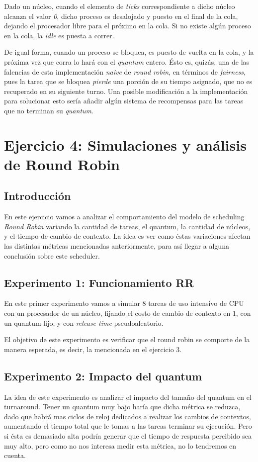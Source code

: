 \documentclass[a4paper]{article}
\begin{document}
Dado un núcleo, cuando el elemento de \textit{ticks} correspondiente a dicho
núcleo alcanza el valor \textit{0}, dicho proceso es desalojado y puesto en
el final de la cola, dejando el procesador libre para el próximo en la cola.
Si no existe algún proceso en la cola, la \textit{idle} es puesta a correr.

De igual forma, cuando un proceso se bloquea, es puesto de vuelta en la
cola, y la próxima vez que corra lo hará con el \textit{quantum} entero.
Ésto es, quizás, una de las falencias de esta implementación \textit{naive}
de \textit{round robin}, en términos de \textit{fairness}, pues la tarea que
se bloquea \textit{pierde} una porción de su tiempo asignado, que no es
recuperado en su siguiente turno. Una posible modificación a la
implementación para solucionar esto sería añadir algún sistema de
recompensas para las tareas que no terminan su \textit{quantum}.

\section{Ejercicio 4: Simulaciones y análisis de Round Robin}

\subsection{Introducción}
En este ejercicio vamos a analizar el comportamiento del modelo de
scheduling \textit{Round Robin} variando la cantidad de tareas, el quantum,
la cantidad de núcleos, y el tiempo de cambio de contexto.
La idea es ver como éstas variaciones afectan las distintas métricas
mencionadas anteriormente, para así llegar a alguna conclusión sobre este
scheduler.

\subsection{Experimento 1: Funcionamiento RR}
En este primer experimento vamos a simular 8 tareas de uso intensivo de CPU
con un procesador de un núcleo, fijando el costo de cambio de contexto en 1,
con un quantum fijo, y con \textit{release time} pseudoaleatorio.

El objetivo de este experimento es verificar que el round robin se comporte
de la manera esperada, es decir, la mencionada en el ejercicio 3.


\subsection{Experimento 2: Impacto del quantum}
La idea de este experimento es analizar el impacto del tamaño del quantum en el turnaround. Tener un quantum muy bajo haría que dicha métrica se reduzca,
dado que habrá mas ciclos de reloj dedicados a realizar los cambios de
contextos, aumentando el tiempo total que le tomas a las tareas terminar su
ejecución. Pero si ésta es demasiado alta podría generar que el tiempo de
respuesta percibido sea muy alto, pero como no nos interesa medir esta
métrica, no lo tendremos en cuenta.
\end{document}
